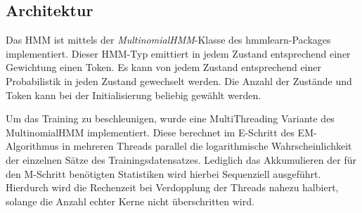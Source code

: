 \documentclass[conference]{IEEEtran}
\begin{document}
\subsection{Architektur}
Das HMM ist mittels der \textit{MultinomialHMM}-Klasse des hmmlearn-Packages \cite{hmmlearn} implementiert. 
Dieser HMM-Typ emittiert in jedem Zustand entsprechend einer Gewichtung einen Token.
Es kann von jedem Zustand entsprechend einer Probabilistik in jeden Zustand gewechselt werden.
Die Anzahl der Zustände und Token kann bei der Initialisierung beliebig gewählt werden.%

Um das Training zu beschleunigen, wurde eine MultiThreading Variante des MultinomialHMM implementiert.
Diese berechnet im E-Schritt des EM-Algorithmus in mehreren Threads parallel die logarithmische Wahrscheinlichkeit der einzelnen Sätze des Trainingsdatensatzes.
Lediglich das Akkumulieren der für den M-Schritt benötigten Statistiken wird hierbei Sequenziell ausgeführt.
Hierdurch wird die Rechenzeit bei Verdopplung der Threads nahezu halbiert, solange die Anzahl echter Kerne nicht überschritten wird.
\end{document}
